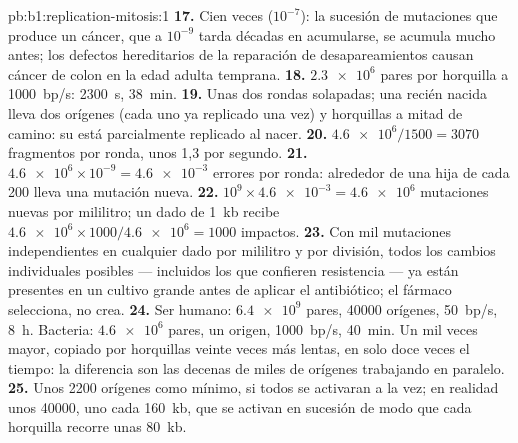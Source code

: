 \begin{solution}{pb:b1:replication-mitosis:1}
\textbf{17.} Cien veces ($10^{-7}$): la sucesión de mutaciones que produce
un cáncer, que a $10^{-9}$ tarda décadas en acumularse, se acumula mucho
antes; los defectos hereditarios de la reparación de desapareamientos causan
cáncer de colon en la edad adulta temprana.
\textbf{18.} $\num{2.3e6}$ pares por horquilla a \qty{1000}{bp/s}:
\qty{2300}{s}, \qty{38}{min}.
\textbf{19.} Unas dos rondas solapadas; una  recién nacida lleva dos
orígenes (cada uno ya replicado una vez) y horquillas a mitad de camino: su
 está parcialmente replicado al nacer.
\textbf{20.} $\num{4.6e6}/1500 = 3070$ fragmentos por ronda, unos 1,3 por
segundo.
\textbf{21.} $\num{4.6e6}\times 10^{-9} = \num{4.6e-3}$ errores por ronda:
alrededor de una hija de cada 200 lleva una mutación nueva.
\textbf{22.} $10^9\times\num{4.6e-3} = \num{4.6e6}$ mutaciones nuevas por
mililitro; un  dado de \qty{1}{kb} recibe $\num{4.6e6}\times
1000/\num{4.6e6} = 1000$ impactos.
\textbf{23.} Con mil mutaciones independientes en cualquier  dado por
mililitro y por división, todos los cambios individuales posibles ---
incluidos los que confieren resistencia --- ya están presentes en un cultivo
grande antes de aplicar el antibiótico; el fármaco selecciona, no crea.
\textbf{24.} Ser humano: $\num{6.4e9}$ pares, \num{40000} orígenes,
\qty{50}{bp/s}, \qty{8}{h}. Bacteria: $\num{4.6e6}$ pares, un origen,
\qty{1000}{bp/s}, \qty{40}{min}. Un  mil veces mayor, copiado por
horquillas veinte veces más lentas, en solo doce veces el tiempo: la
diferencia son las decenas de miles de orígenes trabajando en paralelo.
\textbf{25.} Unos \num{2200} orígenes como mínimo, si todos se activaran a
la vez; en realidad unos \num{40000}, uno cada \qty{160}{kb}, que se activan
en sucesión de modo que cada horquilla recorre unas \qty{80}{kb}.
\end{solution}
